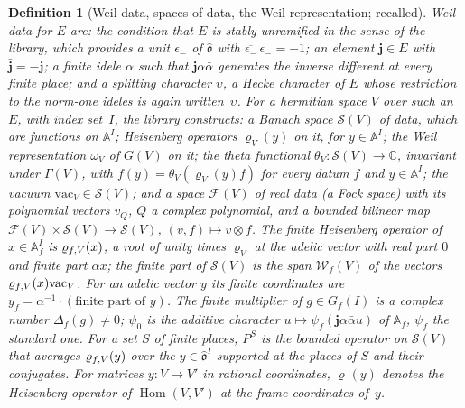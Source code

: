 \documentclass[11pt,a4paper]{article}
\newcommand{\Hom}{\operatorname{Hom}}
\newcommand{\kw}[1]{\emph{#1}}
\newcommand{\m}[1]{\mbox{$#1$}}        %
\theoremstyle{plainx}
\theoremstyle{uprightx}
\newtheorem{definition}[theorem]{Definition}
\newcommand{\CC}{\mathbb{C}}
\newcommand{\A}{\mathbb{A}}
\newcommand{\Af}{\mathbb{A}_f}
\newcommand{\Oh}{\hat{\mathfrak{o}}}
\newcommand{\cj}[1]{\overline{#1}}
\newcommand{\Sch}[1]{\mathcal{S}(#1)}           %
\newcommand{\Wf}[1]{\mathcal{W}_f(#1)}          %
\newcommand{\om}[1]{\omega_{#1}}                %
\newcommand{\rh}[1]{\varrho_{#1}}               %
\newcommand{\rhf}[1]{\varrho_{f\ifx\relax#1\relax\else,#1\fi}}   %
\newcommand{\vac}[1]{\mathrm{vac}_{#1}}         %
\newcommand{\tht}[1]{\theta_{#1}}               %
\newcommand{\Df}{\Delta_f}                      %
\newcommand{\Hm}[2]{\Hom(#1,#2)}
\newcommand{\Gg}[1]{G(#1)}
\newcommand{\Gfin}[1]{G_f(#1)}
\newcommand{\epsm}{\epsilon_{-}}                        %
\newcommand{\psio}{\psi_0}
\newcommand{\Fock}[1]{\mathcal{F}(#1)}                  %
\begin{document}
\begin{definition}[Weil data, spaces of data, the Weil representation; recalled]\label{d:weil}
\kw{Weil data} for $E$ are: the condition that $E$ is stably unramified in the sense of the library, which
provides a unit $\epsm$ of $\Oh$ with \m{\cj{\epsm}\,\epsm=-1}; an element \m{\mathbf{j}\in E} with
\m{\bar{\mathbf{j}}=-\mathbf{j}}; a finite idele $\alpha$ such that \m{\mathbf{j}\alpha\bar\alpha} generates the
inverse different at every finite place; and a splitting character $\upsilon$, a Hecke character of $E$ whose
restriction to the norm-one ideles is again written~$\upsilon$. For a hermitian space $V$ over such an $E$, with
index set~$I$, the library constructs: a Banach space $\Sch{V}$ of \kw{data}, which are functions on $\A^{I}$;
\kw{Heisenberg operators} $\rh{V}(y)$ on it, for \m{y\in\A^{I}}; the \kw{Weil representation} $\om{V}$ of $\Gg{V}$
on it; the \kw{theta functional} \m{\tht{V}\colon\Sch{V}\to\CC}, invariant under $\Gamma(V)$, with
\m{f(y)=\tht{V}(\rh{V}(y)f)} for every datum $f$ and \m{y\in\A^{I}}; the \kw{vacuum}
\m{\vac{V}\in\Sch{V}}; and a space $\Fock{V}$ of \kw{real data} (a Fock space) with its \kw{polynomial vectors}
$v_Q$, $Q$ a complex polynomial, and a bounded bilinear map \m{\Fock{V}\times\Sch{V}\to\Sch{V}},
\m{(v,f)\mapsto v\otimes f}. The \kw{finite Heisenberg operator} of \m{x\in\Af^{I}} is $\rhf{V}(x)$, a root of unity
times $\rh{V}$ at the adelic vector with real part $0$ and finite part $\alpha x$; the \kw{finite part} of
$\Sch{V}$ is the span $\Wf{V}$ of the vectors \m{\rhf{V}(x)\vac{V}}. For an adelic vector $y$ its \kw{finite
coordinates} are \m{y_f=\alpha^{-1}\cdot(\text{finite part of }y)}. The \kw{finite multiplier} of
\m{g\in\Gfin{I}} is a complex number \m{\Df(g)\ne0}; $\psio$ is the additive character
\m{u\mapsto\psi_f(\mathbf{j}\alpha\bar\alpha u)} of $\Af$, $\psi_f$ the standard one. For a set $S$ of finite
places, $P^{S}$ is the bounded operator on $\Sch{V}$ that averages $\rhf{V}(y)$ over the \m{y\in\Oh^{I}} supported at
the places of $S$ and their conjugates. For matrices \m{y\colon V\to V'} in rational coordinates, \m{\rh{}(y)}
denotes the Heisenberg operator of $\Hm{V}{V'}$ at the frame coordinates of~$y$.
\end{definition}
\end{document}
